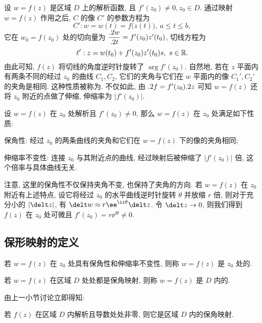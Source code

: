设 $w=f(z)$ 是区域 $D$ 上的解析函数, 且 $f'(z_0)\neq 0,z_0\in D$.
通过映射 $w=f(z)$ 作用之后, $C$ 的像 $C'$ 的参数方程为
\[
  C':w=w(t)=f\bigl(z(t)\bigr),\ a\le t\le b,
\]
它在 $w_0=f(z_0)$ 处的切向量为 $\dfrac{.2 w}{.2 t}=f'(z_0) z'(t_0)$, 切线方程为
\[
  \ell': z=w(t_0)+f'(z_0) z'(t_0)s,\ s\in{\mathbb{R}}.
\]
由此可知, $f(z)$ 将切线的角度逆时针旋转了 $\arg f'(z_0)$.
自然地, 若在 $z$ 平面内有两条不同的经过 $z_0$ 的曲线 $C_1,C_2$, 它们的夹角与它们在 $w$ 平面内的像 $C_1',C_2'$ 的夹角是相同.
这种性质被称为.
不仅如此, 由 $.2 f=f'(z_0).2 z$ 可知 $w=f(z)$ 还将 $z_0$ 附近的点做了伸缩, 伸缩率为 $|f'(z_0)|$.

\begin{theorem}
  设 $w=f(z)$ 在 $z_0$ 处解析且 $f'(z_0)\neq0$, 那么 $w=f(z)$ 在 $z_0$ 处满足如下性质:
  \begin{enumpar}
    \item 保角性: 经过 $z_0$ 的两条曲线的夹角和它们在 $w=f(z)$ 下的像的夹角相同;
    \item 伸缩率不变性: 连接 $z_0$ 与其附近点的曲线, 经过映射后被伸缩了 $|f'(z_0)|$ 倍, 这个倍率与具体曲线无关.\footnotemark
  \end{enumpar}
\end{theorem}

注意, 这里的保角性不仅保持夹角不变, 也保持了夹角的方向.
若 $w=f(z)$ 在 $z_0$ 附近有上述特点, 设它将经过 $z_0$ 的水平曲线逆时针旋转 $\theta$ 并放缩 $r$ 倍, 则对于充分小的 $|\delt z|$, 有 $\delt w\approx r\ee^{\ii\theta}\delt z$.
令 $\delt z\ra 0$, 则我们得到 $f(z)$ 在 $z_0$ 处可微且 $f'(z_0)=r\ee^{\ii\theta}\neq0$.


\subsection{保形映射的定义}

\begin{definition}
  \begin{enumpar}
    \item 若 $w=f(z)$ 在 $z_0$ 处具有保角性和伸缩率不变性, 则称 $w=f(z)$ 是 $z_0$ 处的.
    \item 若 $w=f(z)$ 在区域 $D$ 处处都是保角映射, 则称 $w=f(z)$ 是 $D$ 内的.
  \end{enumpar}
\end{definition}

由上一小节讨论立即得知:
\begin{theorem}
  若 $f(z)$ 在区域 $D$ 内解析且导数处处非零, 则它是区域 $D$ 内的保角映射.
\end{theorem}

